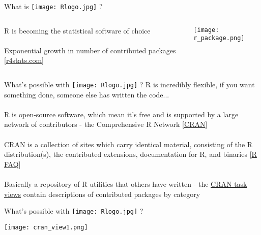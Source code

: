 \documentclass[xcolor=svgnames]{beamer}
\begin{document}
\begin{frame}[t]{What is \texttt{[image: Rlogo.jpg]} \hspace{0.2em}? }
\vspace{-0.1in}
\begin{columns}
\begin{column}{0.4\textwidth}
R is becoming the statistical software of choice\\~\\
Exponential growth in number of contributed packages
[\href{http://r4stats.com/articles/popularity/}{r4stats.com}]
\end{column}
\begin{column}{0.5\textwidth}
\begin{center}
\texttt{[image: r\_package.png]}
\end{center}
\end{column}
\end{columns}
\end{frame}

\begin{frame}{What's possible with \texttt{[image: Rlogo.jpg]} \hspace{0.2em}? }
R is incredibly flexible, if you want something done, someone else has written the code...\\~\\
R is open-source software, which mean it's free and is supported by a large network of contributors - the Comprehensive R Network [\href{http://cran.us.r-project.org/}{CRAN}]\\~\\
CRAN is a collection of sites which carry identical material, consisting of the R distribution(s), the contributed extensions, documentation for R, and binaries [\href{http://cran.us.r-project.org/faqs.html}{R FAQ}]\\~\\
Basically a repository of R utilities that others have written - the \href{http://cran.r-project.org/web/views/}{CRAN task views} contain descriptions of contributed packages by category
\end{frame}

\begin{frame}[t]{What's possible with \texttt{[image: Rlogo.jpg]} \hspace{0.2em}? }
\begin{center}
\texttt{[image: cran\_view1.png]}
\end{center}
\end{frame}
\end{document}
